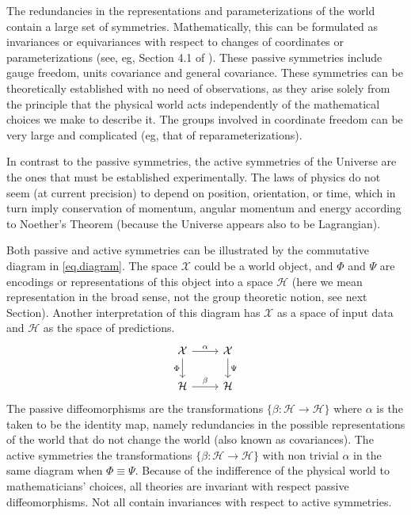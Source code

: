 \documentclass{article}
\begin{document}
The redundancies in the representations and parameterizations of the world contain a large set of symmetries.
Mathematically, this can be formulated as invariances or equivariances with respect to changes of coordinates or parameterizations (see, eg, Section 4.1 of \cite{rovelli2000loop}).
These passive symmetries include gauge freedom, units covariance and general covariance.
These symmetries can be theoretically established with no need of observations, as they arise solely from the principle that the physical world acts independently of the mathematical choices we make to describe it.
The groups involved in coordinate freedom can be very large and complicated (eg, that of reparameterizations).

In contrast to the passive symmetries, the active symmetries of the Universe are the ones that must be established experimentally.
The laws of physics do not seem (at current precision) to depend on position, orientation, or time, which in turn imply conservation of momentum, angular momentum and energy according to Noether's Theorem \cite{noether} (because the Universe appears also to be Lagrangian).

Both passive and active symmetries can be illustrated by the commutative diagram in \eqref{eq.diagram}. The space $\mathcal X$ could be a world object, and $\Phi$ and $\Psi$ are encodings or representations of this object into a space $\mathcal H$ (here we mean representation in the broad sense, not the group theoretic notion, see next Section). Another interpretation of this diagram has $\mathcal X$ as a space of input data and $\mathcal H$ as the space of predictions.
\begin{equation}\label{eq.diagram}
\begin{tikzcd}[]%
  {\cal X}\arrow[r,"\alpha"] \arrow[d,"\Phi",swap] & {\cal X}  \arrow[d,"\Psi"]\\
{\cal H} \arrow[r,"\beta"]  & {\cal H} 
\end{tikzcd}
\end{equation}
The passive diffeomorphisms are the transformations $\{\beta:\mathcal H \to \mathcal H\}$ where $\alpha$ is the taken to be the identity map, namely redundancies in the possible representations of the world that do not change the world (also known as covariances). The active symmetries the transformations $\{\beta:\mathcal H \to \mathcal H\}$ with non trivial $\alpha$ in the same diagram when $\Phi\equiv \Psi$.
Because of the indifference of the physical world to mathematicians' choices, all theories are invariant with respect passive diffeomorphisms.
Not all contain invariances with respect to active symmetries. 
\end{document}
